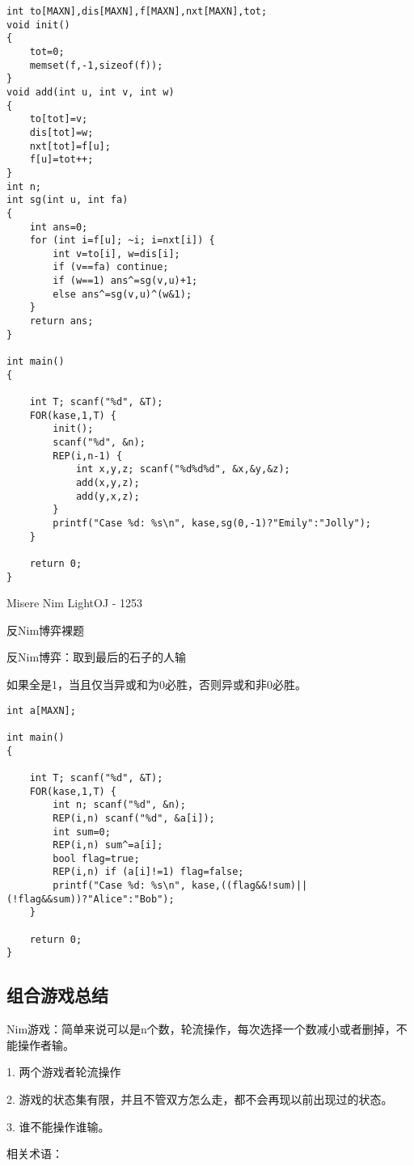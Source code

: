 \begin{lstlisting}
int to[MAXN],dis[MAXN],f[MAXN],nxt[MAXN],tot;
void init()
{
    tot=0;
    memset(f,-1,sizeof(f));
}
void add(int u, int v, int w)
{
    to[tot]=v;
    dis[tot]=w;
    nxt[tot]=f[u];
    f[u]=tot++;
}
int n;
int sg(int u, int fa)
{
    int ans=0;
    for (int i=f[u]; ~i; i=nxt[i]) {
        int v=to[i], w=dis[i];
        if (v==fa) continue;
        if (w==1) ans^=sg(v,u)+1;
        else ans^=sg(v,u)^(w&1);
    }
    return ans;
}

int main()
{

    int T; scanf("%d", &T);
    FOR(kase,1,T) {
        init();
        scanf("%d", &n);
        REP(i,n-1) {
            int x,y,z; scanf("%d%d%d", &x,&y,&z);
            add(x,y,z);
            add(y,x,z);
        }
        printf("Case %d: %s\n", kase,sg(0,-1)?"Emily":"Jolly");
    }

    return 0;
}
\end{lstlisting}

Misere Nim LightOJ - 1253

反Nim博弈裸题

反Nim博弈：取到最后的石子的人输

如果全是1，当且仅当异或和为0必胜，否则异或和非0必胜。

\begin{lstlisting}
int a[MAXN];

int main()
{

    int T; scanf("%d", &T);
    FOR(kase,1,T) {
        int n; scanf("%d", &n);
        REP(i,n) scanf("%d", &a[i]);
        int sum=0;
        REP(i,n) sum^=a[i];
        bool flag=true;
        REP(i,n) if (a[i]!=1) flag=false;
        printf("Case %d: %s\n", kase,((flag&&!sum)||(!flag&&sum))?"Alice":"Bob");
    }

    return 0;
}
\end{lstlisting}

\subsection{组合游戏总结}

Nim游戏：简单来说可以是n个数，轮流操作，每次选择一个数减小或者删掉，不能操作者输。

1. 两个游戏者轮流操作

2. 游戏的状态集有限，并且不管双方怎么走，都不会再现以前出现过的状态。

3. 谁不能操作谁输。


相关术语：

